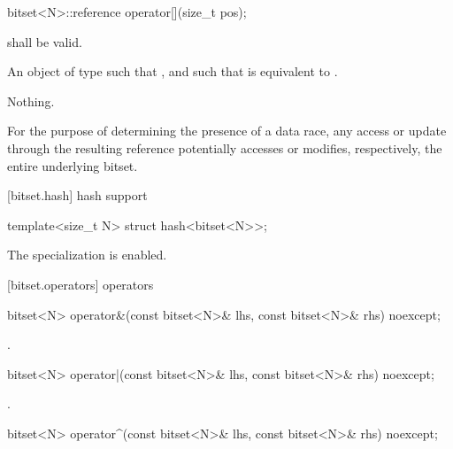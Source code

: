 %
\begin{itemdecl}
bitset<N>::reference operator[](size_t pos);
\end{itemdecl}

\begin{itemdescr}
\pnum
\requires
{} shall be valid.

\pnum
\returns
An object of type
such that
,
and such that
is equivalent to
.

\pnum
\throws Nothing.

\pnum
\remarks For the purpose of determining the presence of a data
race, any access or update through the resulting
reference potentially accesses or modifies, respectively, the entire
underlying bitset.
\end{itemdescr}

[bitset.hash]{ hash support}

%
\begin{itemdecl}
template<size_t N> struct hash<bitset<N>>;
\end{itemdecl}

\begin{itemdescr}
\pnum The specialization is enabled.
\end{itemdescr}


[bitset.operators]{ operators}

%
\begin{itemdecl}
bitset<N> operator&(const bitset<N>& lhs, const bitset<N>& rhs) noexcept;
\end{itemdecl}

\begin{itemdescr}
\pnum
\returns
{}.
\end{itemdescr}

%
\begin{itemdecl}
bitset<N> operator|(const bitset<N>& lhs, const bitset<N>& rhs) noexcept;
\end{itemdecl}

\begin{itemdescr}
\pnum
\returns
{}.
\end{itemdescr}

%
\begin{itemdecl}
bitset<N> operator^(const bitset<N>& lhs, const bitset<N>& rhs) noexcept;
\end{itemdecl}

